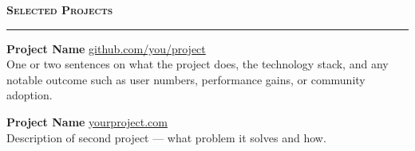 \documentclass[10pt, a4paper]{article}
\newcommand{\mainheading}[1]{%
  \vspace{10pt}%
  {\normalsize\textsc{\textbf{#1}}}\\[-4pt]%
  \rule{\linewidth}{0.4pt}%
  \vspace{4pt}%
}
\begin{document}
\begin{minipage}[t]{0.67\textwidth}
  \mainheading{Selected Projects}

  \noindent\textbf{Project Name} \hfill
  {\small\href{https://github.com/you/project}{github.com/you/project}}\\
  {\small One or two sentences on what the project does, the technology stack,
  and any notable outcome such as user numbers, performance gains, or community adoption.}

  \vspace{6pt}

  \noindent\textbf{Project Name} \hfill
  {\small\href{https://yourproject.com}{yourproject.com}}\\
  {\small Description of second project — what problem it solves and how.}

\end{minipage}

\end{document}
